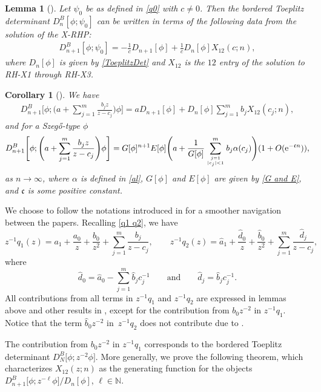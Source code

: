 \documentclass[10pt,a4paper]{amsart}
\numberwithin{equation}{section}
\newtheorem{Corollary}[Theorem]{Corollary}
\newtheorem{Lemma}[Theorem]{Lemma}
 { \theoremstyle{definition}
\newtheorem{Definition}[Theorem]{Definition}
\newtheorem{Example}[Theorem]{Example}
\newtheorem{Remark}[Theorem]{Remark}
\newtheorem{Question}[Theorem]{Question}
}
\newcommand{\N}{{\mathbb N}}
\newcommand{\al}{\alpha}
\newcommand{\di}{\displaystyle}
\newcommand{\qandq}{\qquad \text{and} \qquad}
\begin{document}
	\begin{Lemma}[\cite{BEGIL}]\label{lem2.2} Let $\psi_0$ be as defined in \eqref{q0} with $c \neq 0$. Then the bordered Toeplitz determinant $D^{B}_n[\phi;\psi_0]$ can be written in terms of the following data from the solution of the X-RHP:
		\begin{gather*}%
			D^{B}_{n+1}[\phi;\psi_0] = - \frac{1}{c}D_{n+1}[\phi]+ \frac{1}{c} D_{n}[\phi] X_{12}(c;n),
		\end{gather*}
		where $D_{n}[\phi]$ is given by \eqref{ToeplitzDet} and $X_{12}$ is the $12$ entry of the solution to {\rm RH-X1} through {\rm RH-X3}.
	\end{Lemma}
	\begin{Corollary}[\cite{BEGIL}]\label{cor 2}
		We have
		\begin{gather*}%
			D^B_{n+1}\Bigg[\phi;\di\Bigg( a+\sum^{m}_{j=1}\frac{b_j z}{z-c_j}\Bigg)\phi \Bigg] =aD_{n+1}[\phi]+ D_n[\phi] \sum^{m}_{j=1}b_j X_{12}(c_j;n),
		\end{gather*}
		and for a Szeg\H{o}-type $\phi$
		\begin{gather*}%
			D^B_{n+1}\Bigg[\phi;\di\Bigg( a+\sum^{m}_{j=1}\frac{b_j z}{z-c_j}\Bigg)\phi \Bigg] = G[\phi]^{n+1} E[\phi] \Bigg(a+\frac{1}{G[\phi]}\sum^{m}_{j=1 \atop |c_j|<1 }b_j \al(c_j)\Bigg)( 1 + O({\rm e}^{-\mathfrak{c}n})),
		\end{gather*}
		as $n \to \infty$, where $\al$ is defined in \eqref{al}, $G[\phi]$ and $E[\phi]$ are given by \eqref{G and E}, and $\mathfrak{c}$ is some positive constant.
	\end{Corollary}
	
	We choose to follow the notations introduced in \cite{BEGIL} for a smoother navigation between the papers. Recalling \eqref{q1 q2}, we have
	\[ 	z^{-1}q_1(z) = a_1+ \frac{a_0}{z} +\frac{b_0}{z^2}+\sum^{m}_{j=1}\frac{b_j}{z-c_j}, \qquad z^{-1}q_2(z) = \hat{a}_1 + \frac{\hat{d}_0 }{z}+\frac{\hat{b}_0}{z^2}+%
	\sum_{j=1}^m \frac{\hat{d}_j}{z-c_j}, \]
	where
	\[ \hat{d}_0 = \hat{a}_0 - \sum_{j=1}^{m} \hat{b}_jc^{-1}_j \qandq \hat{d}_j = \hat{b}_jc^{-1}_j. \]
	All contributions from all terms in $z^{-1}q_1$ and $z^{-1}q_2$ are expressed in lemmas above and other results in \cite{BEGIL}, except for the contribution from $b_0z^{-2}$ in $z^{-1}q_1$. Notice that the term $\hat{b}_0z^{-2}$ in~$z^{-1}q_2$ does not contribute due to \cite[Lemma 2.1]{BEGIL}.
	
The contribution from $b_0z^{-2}$ in $z^{-1}q_1$ corresponds to the bordered Toeplitz determinant $D^{B}_N\big[\phi;z^{-2}\phi\big]$. More generally, we prove the following theorem, which characterizes $X_{12}(z;n)$ as the generating function for the objects $D^B_{n+1}\big[\phi;z^{-\ell}\phi\big]/D_n[\phi]$, $\ell \in \N$.
	
\end{document}
